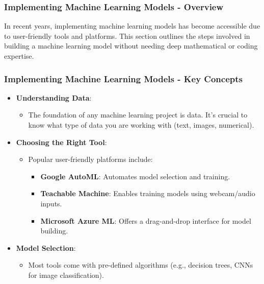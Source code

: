 \documentclass[aspectratio=169]{beamer}
\begin{document}
\begin{frame}[fragile]
    \frametitle{Implementing Machine Learning Models - Overview}
    In recent years, implementing machine learning models has become accessible due to user-friendly tools and platforms. 
    This section outlines the steps involved in building a machine learning model without needing deep mathematical or coding expertise.
\end{frame}

\begin{frame}[fragile]
    \frametitle{Implementing Machine Learning Models - Key Concepts}
    \begin{itemize}
        \item \textbf{Understanding Data}:
        \begin{itemize}
            \item The foundation of any machine learning project is data. It's crucial to know what type of data you are working with (text, images, numerical).
        \end{itemize}

        \item \textbf{Choosing the Right Tool}:
        \begin{itemize}
            \item Popular user-friendly platforms include:
            \begin{itemize}
                \item \textbf{Google AutoML}: Automates model selection and training.
                \item \textbf{Teachable Machine}: Enables training models using webcam/audio inputs.
                \item \textbf{Microsoft Azure ML}: Offers a drag-and-drop interface for model building.
            \end{itemize}
        \end{itemize}
        
        \item \textbf{Model Selection}:
        \begin{itemize}
            \item Most tools come with pre-defined algorithms (e.g., decision trees, CNNs for image classification).
        \end{itemize}
    \end{itemize}
\end{frame}
\end{document}
